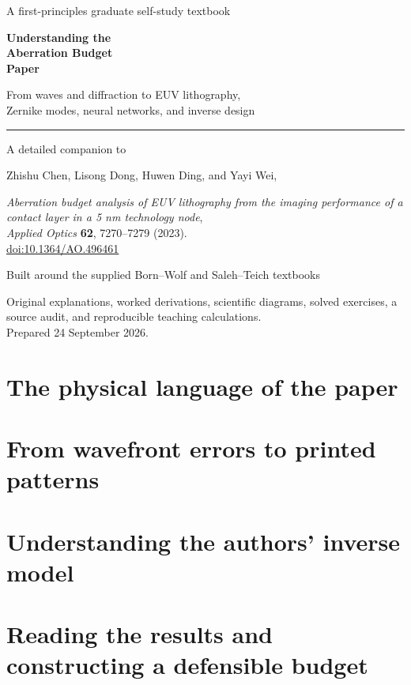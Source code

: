 \documentclass[11pt,a4paper,oneside,openany]{book}
\begin{document}
\frontmatter
\begin{titlepage}
\color{ink}
{\large A first-principles graduate self-study textbook\par}
\vspace{18mm}
{\Huge\bfseries Understanding the\\[3mm] Aberration Budget\\[3mm] Paper\par}
\vspace{10mm}
{\Large From waves and diffraction to EUV lithography,\\[2mm]
Zernike modes, neural networks, and inverse design\par}
\vspace{12mm}
\rule{\textwidth}{0.8pt}
\vspace{5mm}
{\large A detailed companion to\par}
\vspace{3mm}
{\large Zhishu Chen, Lisong Dong, Huwen Ding, and Yayi Wei,\par}
\textit{Aberration budget analysis of EUV lithography from the imaging
performance of a contact layer in a 5 nm technology node},\\
\textit{Applied Optics} \textbf{62}, 7270--7279 (2023).\\[3mm]
\href{https://doi.org/10.1364/AO.496461}{doi:10.1364/AO.496461}
\vfill
{\large Built around the supplied Born--Wolf and Saleh--Teich textbooks\par}
\vspace{5mm}
{\small Original explanations, worked derivations, scientific diagrams,
solved exercises, a source audit, and reproducible teaching calculations.\\
Prepared 24 September 2026.\par}
\end{titlepage}

\tableofcontents
\mainmatter
\part{The physical language of the paper}


\part{From wavefront errors to printed patterns}


\part{Understanding the authors' inverse model}


\part{Reading the results and constructing a defensible budget}


\appendix

\backmatter

\end{document}

